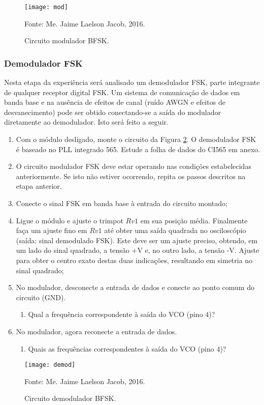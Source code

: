 \begin{figure}[H]
    \centering
    \caption{Circuito modulador BFSK.}
    \texttt{[image: mod]}
    \label{fig:mca8801}
    
    \small Fonte: Me. Jaime Laelson Jacob, 2016.
\end{figure}

\subsubsection{Demodulador FSK}

Nesta etapa da experiência será analisado um demodulador FSK, parte integrante de qualquer receptor digital FSK. Um sistema de comunicação de dados em banda
base e na ausência de efeitos de canal (ruído AWGN e efeitos de desvanecimento) pode ser obtido conectando-se a saída do modulador diretamente ao demodulador.
Isto será feito a seguir.

\begin{enumerate}[label=\Roman*]
    \item Com o módulo desligado, monte o circuito da Figura \ref{fig:565}. O demodulador FSK é baseado no PLL integrado 565. Estude a folha de dados do CI565 em anexo.
    
    \item O circuito modulador FSK deve estar operando nas condições estabelecidas anteriormente. Se isto não estiver ocorrendo, repita os passos descritos na etapa anterior.
    
    \item Conecte o sinal FSK em banda base à entrada do circuito montado;
    
    \item Ligue o módulo e ajuste o trimpot $Rv1$ em sua posição média. Finalmente faça um ajuste fino em $Rv1$ até obter uma saída quadrada no osciloscópio (saída: sinal demodulado FSK). Este deve ser um ajuste preciso, obtendo, em um lado do sinal quadrado, a tensão +V e, no outro lado, a tensão -V. Ajuste para obter o centro exato destas duas indicações, resultando em simetria no sinal quadrado;
    
    \item No modulador, desconecte a entrada de dados e conecte ao ponto comum do circuito (GND).
    
    \begin{enumerate}[label=\alph*]
        \item Qual a frequência correspondente à saída do VCO (pino 4)?
    \end{enumerate}

    \item No modulador, agora reconecte a entrada de dados.
    
    \begin{enumerate}[label=\alph*]
        \item Quais as frequências correspondentes à saída do VCO (pino 4)? 
    \end{enumerate}
\end{enumerate}

\begin{figure}[H]
    \centering
    \caption{Circuito demodulador BFSK.}
    \texttt{[image: demod]}
    \label{fig:565}
    
    \small Fonte: Me. Jaime Laelson Jacob, 2016.
\end{figure}